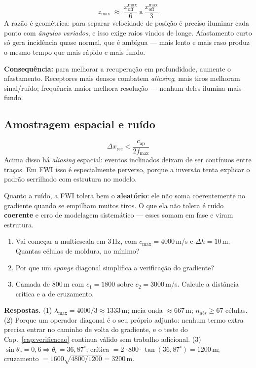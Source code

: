 \documentclass[11pt,a4paper,oneside]{report}
\begin{document}
\begin{teoria}
\[
z_{\max} \;\approx\; \frac{x_{\text{off}}^{\max}}{6}
\ \text{a}\ \frac{x_{\text{off}}^{\max}}{3}
\]
A raz\~ao \'e geom\'etrica: para separar velocidade de posi\c{c}\~ao \'e
preciso iluminar cada ponto com \emph{\^angulos variados}, e isso exige raios
vindos de longe. Afastamento curto s\'o gera incid\^encia quase normal, que
\'e amb\'igua --- mais lento e mais raso produz o mesmo tempo que mais
r\'apido e mais fundo.

\textbf{Consequ\^encia:} para melhorar a recupera\c{c}\~ao em profundidade,
aumente o afastamento. Receptores mais densos combatem \emph{aliasing}; mais
tiros melhoram sinal/ru\'ido; frequ\^encia maior melhora resolu\c{c}\~ao ---
nenhum deles ilumina mais fundo.
\end{teoria}

\subsection*{Amostragem espacial e ru\'ido}

\begin{equation}
\Delta x_{\text{rec}} < \frac{c_{\text{ap}}}{2 f_{\max}}
\end{equation}
Acima disso h\'a \emph{aliasing} espacial: eventos inclinados deixam de ser
cont\'inuos entre tra\c{c}os. Em FWI isso \'e especialmente perverso, porque a
invers\~ao tenta explicar o padr\~ao serrilhado com estrutura no modelo.

Quanto a ru\'ido, a FWI tolera bem o \textbf{aleat\'orio}: ele n\~ao soma
coerentemente no gradiente quando se empilham muitos tiros. O que ela n\~ao
tolera \'e ru\'ido \textbf{coerente} e erro de modelagem sistem\'atico ---
esses somam em fase e viram estrutura.

\begin{exercicio}
\begin{enumerate}[leftmargin=*, itemsep=2pt]
\item Vai come\c{c}ar a multiescala em 3\,Hz, com $c_{\max} = 4000$\,m/s e
$\Delta h = 10$\,m. Quantas c\'elulas de moldura, no m\'inimo?
\item Por que um \emph{sponge} diagonal simplifica a verifica\c{c}\~ao do
gradiente?
\item Camada de 800\,m com $c_1 = 1800$ sobre $c_2 = 3000$\,m/s. Calcule a
dist\^ancia cr\'itica e a de cruzamento.
\end{enumerate}
\textbf{Respostas.} (1) $\lambda_{\max} = 4000/3 \approx 1333$\,m; meia onda
$\approx 667$\,m; $n_{abs} \ge 67$ c\'elulas. (2) Porque um operador diagonal
\'e o seu pr\'oprio adjunto: nenhum termo extra precisa entrar no caminho de
volta do gradiente, e o teste do Cap.~\ref{cap:verificacao} continua v\'alido
sem trabalho adicional. (3) $\sin\theta_c = 0{,}6 \Rightarrow \theta_c =
36{,}87^{\circ}$; cr\'itica $= 2\cdot800\cdot\tan(36{,}87^{\circ}) = 1200$\,m;
cruzamento $= 1600\sqrt{4800/1200} = 3200$\,m.
\end{exercicio}
\end{document}

